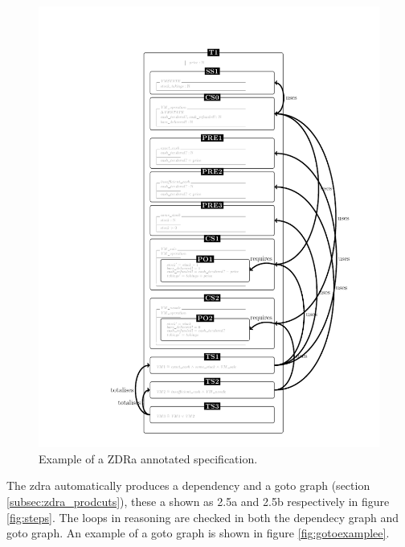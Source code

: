 \begin{figure}[H]
 \begin{center}
 \includegraphics [scale=0.25]{Figures/Design/zdracomp.png}
 \caption{Example of a ZDRa annotated specification.}
 \label{fig:zdraexample}
\end{center}
\end{figure} 

The \gls{zdra} automatically produces a dependency and a goto graph (section \ref{subsec:zdra_prodcuts}), these a shown as 2.5a and 2.5b respectively in figure \ref{fig:steps}. The loops in reasoning are checked in both the dependecy graph and goto graph. An example of a goto graph is shown in figure \ref{fig:gotoexamplee}.

